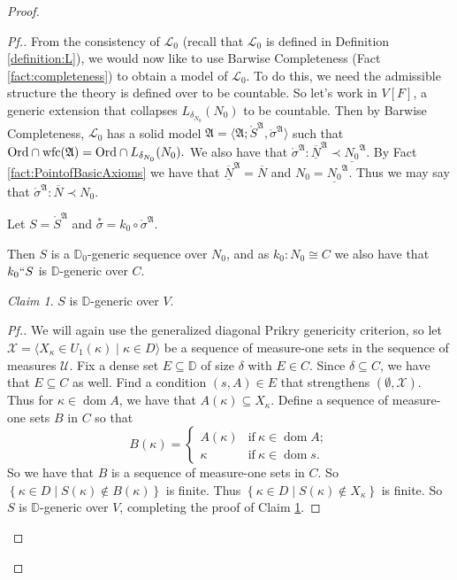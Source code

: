 \documentclass{amsart}
\theoremstyle{definition}
\theoremstyle{remark}
\newtheorem{claimno}{Claim}
\newcommand{\D}{\mathbb{D}}
\newcommand{\N}{{\overline{N}}}
\newcommand{\U}{\mathcal{U}}
\newcommand{\Ord}{\textup{\ensuremath{\text{Ord}}}}
\DeclareMathOperator{\dom}{dom}
\DeclareMathOperator{\wfc}{wfc}
\newcommand{\st}{\; | \;}
\newcommand{\set}[2]{\left\{#1\st #2 \right\}}
\newcommand{\seq}[2]{\langle #1 \st #2 \rangle}
\begin{document}
\begin{proof}
\begin{proof}[Pf.]
From the consistency of $\mathcal L_0$ (recall that $\mathcal L_0$ is defined in Definition \ref{definition:L}), we would now like to use Barwise Completeness (Fact \ref{fact:completeness}) to obtain a model of $\mathcal L_0$. To do this, we need the admissible structure the theory is defined over to be countable. So let's work in $V[F]$, a generic extension that collapses $L_{\delta_{N_0}}(N_0)$ to be countable. Then by Barwise Completeness, $\mathcal L_0$ has a solid model 
	$\mathfrak A = \langle \mathfrak A; \mathring{S}^{\mathfrak A}, \mathring{\sigma}^{\mathfrak A} \rangle$ such that $\Ord \cap \wfc(\mathfrak A) = \Ord \cap L_{\delta_{N_0}}(N_0).$
We also have that $\mathring \sigma^{\mathfrak A}: \overline{\underline N}^{\mathfrak A} \prec \underline{N_0}^{\mathfrak A}$. By Fact \ref{fact:PointofBasicAxioms} we have that $\overline{\underline N}^{\mathfrak A}=\N$ and $N_0=\underline{N_0}^{\mathfrak A}$. Thus we may say that  $\mathring \sigma^{\mathfrak A}: \N \prec N_0$. 

Let $S = \mathring{S}^{\mathfrak A}$ and $\overset{*} {\sigma}=k_0 \circ \mathring{\sigma}^{\mathfrak A}$. 

Then $S$ is a $\D_0$-generic sequence over $N_0$, and as $k_0:N_0 \cong C$ we also have that $k_0``S$ is $\D$-generic over $C$. 

\begin{claimno} \label{claim:SisDgenericOverV} $S$ is $\D$-generic over $V$. \end{claimno}
\begin{proof}[Pf.]
We will again use the generalized diagonal Prikry genericity criterion, so let $\mathcal X = \seq{ X_\kappa \in U_1(\kappa) }{ \kappa \in D }$ be a sequence of measure-one sets in the sequence of measures $\U$. Fix a dense set $E \subseteq \D$ of size $\delta$ with $E \in C$. Since $\delta \subseteq C$, we have that $E \subseteq C$ as well. Find a condition $(s,A) \in E$ that strengthens $(\emptyset, \mathcal X)$. Thus for $\kappa \in \dom A$, we have that $A(\kappa) \subseteq X_\kappa$. Define a sequence of measure-one sets $B$ in $C$ so that 
$$B(\kappa) = \begin{cases} A(\kappa) &\text{if} \ \kappa \in \dom A; \\ \kappa &\text{if} \ \kappa \in \dom s. \end{cases}$$
So we have that $B$ is a sequence of measure-one sets in $C$. So $\set{ \kappa \in D }{S(\kappa) \notin B(\kappa) }$ is finite. Thus $\set{\kappa \in D}{ S(\kappa) \notin X_\kappa}$ is finite. So $S$ is $\D$-generic over $V$, completing the proof of Claim \ref{claim:SisDgenericOverV}.
\end{proof}


\end{proof}
\end{proof}
\end{document}
